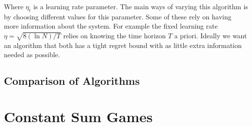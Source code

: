 \documentclass[10pt,a4paper]{article} %
\begin{document}
	Where $\eta_t$ is a learning rate parameter.  The main ways of varying this algorithm is by choosing different values for this parameter.  Some of these rely on having more information about the system.  For example the fixed learning rate $\eta = \sqrt{8 (\ln{N})/T}$ relies on knowing the time horizon $T$ a priori.  Ideally we want an algorithm that both has a tight regret bound with as little extra information needed as possible.
	
	\subsection{Comparison of Algorithms}
	
	\begin{table}[h!]
		\centering

		\label{tab:multicol}
	\end{table}



	\section{Constant Sum Games}
	
\end{document}
